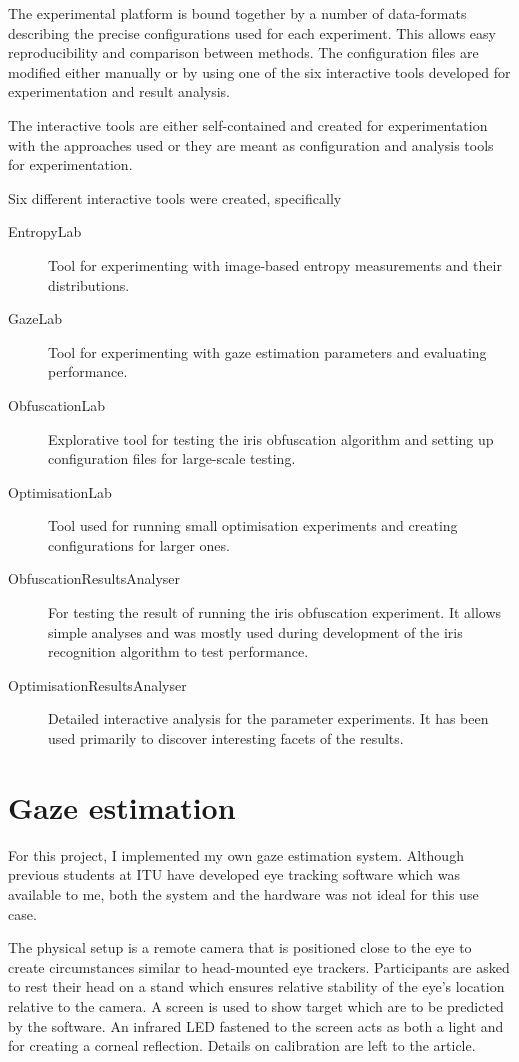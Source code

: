 The experimental platform is bound together by a number of data-formats describing the precise configurations used for each experiment. This allows easy reproducibility and comparison between methods. The configuration files are modified either manually or by using one of the six interactive tools developed for experimentation and result analysis. 

The interactive tools are either self-contained and created for experimentation with the approaches used or they are meant as configuration and analysis tools for experimentation.

Six different interactive tools were created, specifically
\begin{description}
	\item [EntropyLab] Tool for experimenting with image-based entropy measurements and their distributions.
	\item [GazeLab] Tool for experimenting with gaze estimation parameters and evaluating performance.
	\item [ObfuscationLab] Explorative tool for testing the iris obfuscation algorithm and setting up configuration files for large-scale testing. 
	\item [OptimisationLab] Tool used for running small optimisation experiments and creating configurations for larger ones. 
	\item [ObfuscationResultsAnalyser] For testing the result of running the iris obfuscation experiment. It allows simple analyses and was mostly used during development of the iris recognition algorithm to test performance.
	\item [OptimisationResultsAnalyser] Detailed interactive analysis for the parameter experiments. It has been used primarily to discover interesting facets of the results.
\end{description}


\section{Gaze estimation}
For this project, I implemented my own gaze estimation system. Although previous students at ITU have developed eye tracking software which was available to me, both the system and the hardware was not ideal for this use case. 

The physical setup is a remote camera that is positioned close to the eye to create circumstances similar to head-mounted eye trackers. Participants are asked to rest their head on a stand which ensures relative stability of the eye's location relative to the camera. A screen is used to show target which are to be predicted by the software. An infrared LED fastened to the screen acts as both a light and for creating a corneal reflection. Details on calibration are left to the article.


